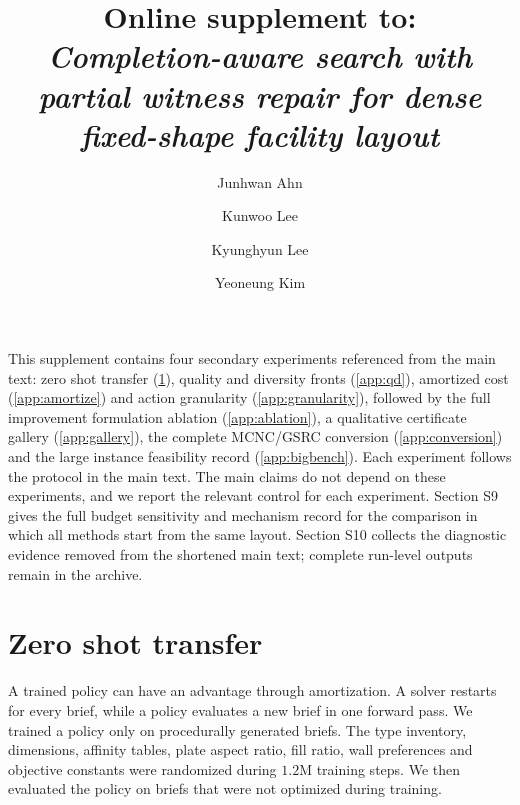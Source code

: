 \documentclass[11pt]{article}
\title{Online supplement to:\\
\emph{Completion-aware search with partial witness repair for dense
fixed-shape facility layout}}
\author{Junhwan Ahn \and Kunwoo Lee \and Kyunghyun Lee \and Yeoneung Kim}
\date{}
\begin{document}
\maketitle

\noindent This supplement contains four secondary experiments
referenced from the main text: zero shot transfer (\ref{app:transfer}),
quality and diversity fronts (\ref{app:qd}), amortized cost (\ref{app:amortize})
and action granularity (\ref{app:granularity}), followed by the full
improvement formulation ablation (\ref{app:ablation}), a qualitative
certificate gallery (\ref{app:gallery}), the complete MCNC/GSRC conversion
(\ref{app:conversion}) and the large instance feasibility record
(\ref{app:bigbench}). Each experiment follows the protocol in the main text.
The main claims do not depend on these experiments, and we report the relevant
control for each experiment. Section S9 gives the full budget sensitivity and
mechanism record for the comparison in which all methods start from the same
layout.
Section S10 collects the diagnostic evidence removed from the shortened main
text; complete run-level outputs remain in the archive.

\section{Zero shot transfer}
\label{app:transfer}
A trained policy can have an advantage through amortization. A solver restarts
for every brief, while a policy evaluates a new brief in one forward pass. We
trained a policy only on procedurally generated briefs. The type inventory,
dimensions, affinity tables, plate aspect ratio, fill ratio, wall preferences
and objective constants were randomized during $1.2$M training steps. We then
evaluated the policy on briefs that were not optimized during training.
\end{document}
